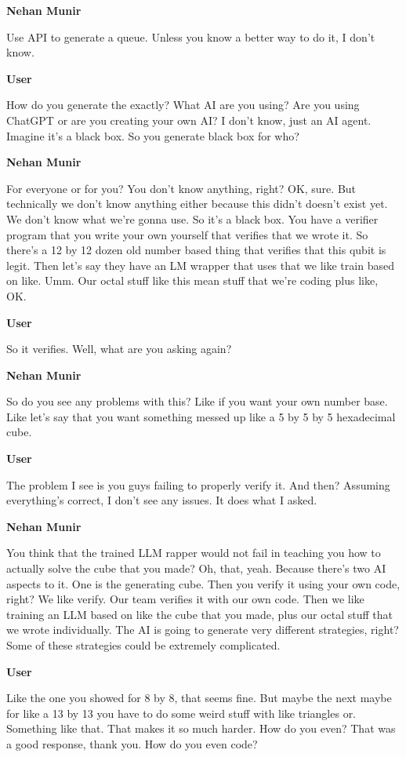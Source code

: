 \documentclass{article}
\begin{document}
\noindent \textbf{Nehan Munir}

Use API to generate a queue. Unless you know a better way to do it, I don't know.

\noindent \textbf{User}

How do you generate the exactly? What AI are you using? Are you using ChatGPT or are you creating your own AI? I don't know, just an AI agent. Imagine it's a black box. So you generate black box for who?

\noindent \textbf{Nehan Munir}

For everyone or for you? You don't know anything, right? OK, sure. But technically we don't know anything either because this didn't doesn't exist yet. We don't know what we're gonna use. So it's a black box. You have a verifier program that you write your own yourself that verifies that we wrote it. So there's a 12 by 12 dozen old number based thing that verifies that this qubit is legit. Then let's say they have an LM wrapper that uses that we like train based on like. Umm. Our octal stuff like this mean stuff that we're coding plus like, OK.

\noindent \textbf{User}

So it verifies. Well, what are you asking again?

\noindent \textbf{Nehan Munir}

So do you see any problems with this? Like if you want your own number base. Like let's say that you want something messed up like a 5 by 5 by 5 hexadecimal cube.

\noindent \textbf{User}

The problem I see is you guys failing to properly verify it. And then? Assuming everything's correct, I don't see any issues. It does what I asked.

\noindent \textbf{Nehan Munir}

You think that the trained LLM rapper would not fail in teaching you how to actually solve the cube that you made? Oh, that, yeah. Because there's two AI aspects to it. One is the generating cube. Then you verify it using your own code, right? We like verify. Our team verifies it with our own code. Then we like training an LLM based on like the cube that you made, plus our octal stuff that we wrote individually. The AI is going to generate very different strategies, right? Some of these strategies could be extremely complicated.

\noindent \textbf{User}

Like the one you showed for 8 by 8, that seems fine. But maybe the next maybe for like a 13 by 13 you have to do some weird stuff with like triangles or. Something like that. That makes it so much harder. How do you even? That was a good response, thank you. How do you even code?
\end{document}
